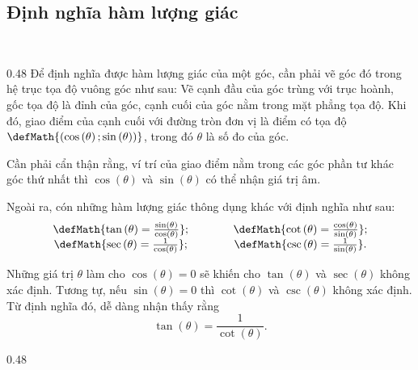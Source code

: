 \subsection{Định nghĩa hàm lượng giác}

\ %

{
   \begin{minipageindent}{0.48\textwidth}
      Để định nghĩa được hàm lượng giác của một góc, cần phải vẽ góc đó trong hệ trục tọa độ vuông góc như sau: Vẽ cạnh đầu của góc trùng với trục hoành, gốc tọa độ là đỉnh của góc, cạnh cuối của góc nằm trong mặt phẳng tọa độ. Khi đó, giao điểm của cạnh cuối với đường tròn đơn vị là điểm có tọa độ $\defMath{\left(\cos \left(\theta\right); \sin \left(\theta\right)\right)}$, trong đó $\theta$ là số đo của góc.

      Cần phải cẩn thận rằng, ví trí của giao điểm nằm trong các góc phần tư khác góc thứ nhất thì $\cos \left(\theta\right)$ và $\sin \left(\theta\right)$ có thể nhận giá trị âm.

      Ngoài ra, cón những hàm lượng giác thông dụng khác với định nghĩa như sau:
      \begin{equation*}
         \begin{array}{ccc}
            \defMath{\tan \left(\theta\right) = \frac{\sin \left(\theta\right)}{\cos \left(\theta\right)}}; &\qquad& \defMath{\cot \left(\theta\right) = \frac{\cos \left(\theta\right)}{\sin \left(\theta\right)}}; \\
            \defMath{\sec \left(\theta\right) = \frac{1}{\cos \left(\theta\right)}}; &\qquad& \defMath{\csc \left(\theta\right) = \frac{1}{\sin \left(\theta\right)}}.
         \end{array}
      \end{equation*}

      Những giá trị $\theta$ làm cho $\cos \left(\theta\right) = 0$ sẽ khiến cho $\tan \left(\theta\right)$ và $\sec \left(\theta\right)$ không xác định. Tương tự, nếu $\sin \left(\theta\right) = 0$ thì $\cot \left(\theta\right)$ và $\csc \left(\theta\right)$ không xác định. Từ định nghĩa đó, dễ dàng nhận thấy rằng $$\tan \left(\theta\right) = \frac{1}{\cot \left(\theta\right)}.$$
   \end{minipageindent}
   \hfill
   \begin{minipageindent}{0.48\textwidth}
      \begin{figure}[H]
         \centering
\end{figure}
\end{minipageindent}}
